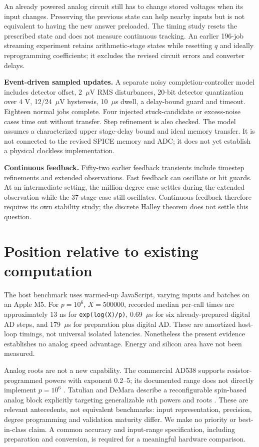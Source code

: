 \documentclass[11pt,a4paper]{article}
\begin{document}
An already powered analog circuit still has to change stored voltages when its input changes. Preserving the previous state can help nearby inputs but is not equivalent to having the new answer preloaded. The timing study resets the prescribed state and does not measure continuous tracking. An earlier 196-job streaming experiment retains arithmetic-stage states while resetting $q$ and ideally reprogramming coefficients; it excludes the revised circuit errors and converter delays.

\textbf{Event-driven sampled updates.} A separate noisy completion-controller model includes detector offset, 2~$\mu$V RMS disturbances, 20-bit detector quantization over 4 V, 12/24~$\mu$V hysteresis, 10~$\mu$s dwell, a delay-bound guard and timeout. Eighteen normal jobs complete. Four injected stuck-candidate or excess-noise cases time out without transfer. Step refinement is also checked. The model assumes a characterized upper stage-delay bound and ideal memory transfer. It is not connected to the revised SPICE memory and ADC; it does not yet establish a physical clockless implementation.

\textbf{Continuous feedback.} Fifty-two earlier feedback transients include timestep refinements and extended observations. Fast feedback can oscillate or hit guards. At an intermediate setting, the million-degree case settles during the extended observation while the 37-stage case still oscillates. Continuous feedback therefore requires its own stability study; the discrete Halley theorem does not settle this question.

\section{Position relative to existing computation}
The host benchmark uses warmed-up JavaScript, varying inputs and batches on an Apple M5. For $p=10^6$, $X=500000$, recorded median per-call times are approximately 13 ns for \texttt{exp(log(X)/p)}, 0.69~$\mu$s for six already-prepared digital AD steps, and 179~$\mu$s for preparation plus digital AD. These are amortized host-loop timings, not universal isolated latencies. Nonetheless the present evidence establishes no analog speed advantage. Energy and silicon area have not been measured.

Analog roots are not a new capability. The commercial AD538 supports resistor-programmed powers with exponent 0.2--5; its documented range does not directly implement $p=10^6$ \cite{ad538}. Tatulian and DeMara describe a reconfigurable spin-based analog block explicitly targeting generalizable $n$th powers and roots \cite{spin}. These are relevant antecedents, not equivalent benchmarks: input representation, precision, degree programming and validation maturity differ. We make no priority or best-in-class claim. A common accuracy and input-range specification, including preparation and conversion, is required for a meaningful hardware comparison.
\clearpage
\end{document}
